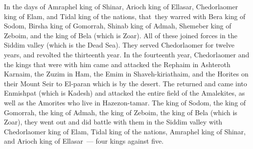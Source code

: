 
\begin{inparaenum}
     In the days of Amraphel king of Shinar, Arioch king of Ellasar, Chedorlaomer king of Elam, and Tidal king of the nations,%
     that\understood\ they warred with Bera king of Sodom, Birsha king of Gomorrah, Shinab king of Admah, Shemeber king of Zeboim, and the king of Bela (which is Zoar).%
     All of these joined forces in the Siddim valley (which is the Dead Sea).%
     They served Chedorlaomer for twelve years, and revolted the thirteenth year.%
     In the fourteenth year, Chedorlaomer and the kings that were with him came and attacked the Rephaim in Ashteroth Karnaim, the Zuzim in Ham, the Emim in Shaveh-kiriathaim,%
     and the Horites on their Mount Seir to El-paran which is by the desert.%
     The returned and came into Enmishpat (which is Kadesh) and attacked the entire field of the Amalekites, as well as the Amorites who live in Hazezon-tamar.%
     The king of Sodom, the king of Gomorrah, the king of Admah, the king of Zeboim, the king of Bela (which is Zoar), they went out and did battle with them in the Siddim valley%
     with Chedorlaomer king of Elam, Tidal king of the nations, Amraphel king of Shinar, and Arioch king of Ellasar~--- four kings against five.%
    
\end{inparaenum}
